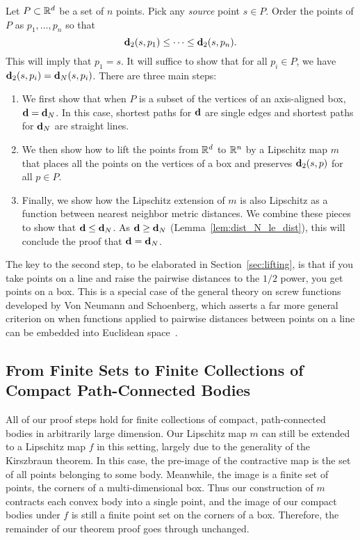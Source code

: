 \label{sec:the_proof}

  Let $P\subset \mathbb{R}^d$ be a set of $n$ points.
  Pick any \emph{source} point $s\in P$.
  Order the points of $P$ as $p_1,\ldots ,p_n$ so that
  \[
    \mathbf{d}_2(s,p_1) \le \cdots \le \mathbf{d}_2(s, p_n).
  \]
  This will imply that $p_1 = s$.
  It will suffice to show that for all $p_i\in P$, we have $\mathbf{d}_2(s,p_i) = \mathbf{d}_N(s,p_i)$.
  There are three main steps:
  \begin{enumerate}
    \item We first show that when $P$ is a subset of the vertices of an axis-aligned box, $\mathbf{d} = \mathbf{d}_N$.  In this case, shortest paths for $\mathbf{d}$ are single edges and shortest paths for $\mathbf{d}_N$ are straight lines.
    \item We then show how to lift the points from $\mathbb{R}^d$ to $\mathbb{R}^n$ by a Lipschitz map $m$ that places all the points on the vertices of a box and preserves $\mathbf{d}_2(s,p)$ for all $p\in P$.
    \item Finally, we show how the Lipschitz extension of $m$ is also Lipschitz as a function between nearest neighbor metric distances.  We combine these pieces to show that $\mathbf{d} \le \mathbf{d}_N$.  As $\mathbf{d} \ge \mathbf{d}_N$ (Lemma~\ref{lem:dist_N_le_dist}), this will conclude the proof that $\mathbf{d} = \mathbf{d}_N$.
  \end{enumerate}
The key to the second step, to be elaborated in Section~\ref{sec:lifting},
is that if you take points on a line and raise the pairwise distances to
the $1/2$ power, you get points on a box. This is a special case of the
general theory on screw functions developed by Von Neumann and Schoenberg,
which asserts a far more general criterion on when functions applied to
pairwise distances between points on a line can be embedded into Euclidean
space~\cite{VonNeumann41}.
  
  
  
\subsection{From Finite Sets to Finite Collections of Compact Path-Connected Bodies}
\label{sec:bodies}
All of our proof steps hold for finite collections of compact,
path-connected bodies in arbitrarily large dimension. Our Lipschitz map $m$ can
still be extended to a Lipschitz map $f$ in this setting, largely due to the
generality of the Kirszbraun theorem. In this case, the pre-image of the
contractive map is the set of all points belonging to some body. Meanwhile, the image is a finite set of points, the corners of a multi-dimensional box.
Thus our construction of $m$ contracts each convex
body into a single point, and the image of our
compact bodies under $f$ is still a finite point set on the corners of a
box. Therefore, the remainder of our theorem proof goes through unchanged.

